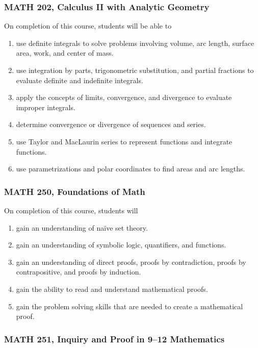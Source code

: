 \documentclass[10pt]{article}
\newenvironment{alphalist}{
\begin{enumerate}[label=(\arabic*),widest=107 ,leftmargin=25pt, itemsep=0pt]}
{\end{enumerate}}
\begin{document}
\subsubsection*{MATH 202, Calculus II with Analytic Geometry}

 On completion of this course, students will be able to
 \begin{alphalist}
    \item use definite integrals to solve problems involving volume, arc length, 
       surface area, work, and center of mass. 
    \item use integration by parts, trigonometric substitution, and partial fractions 
        to evaluate definite and indefinite integrals.
    \item apply the concepts of limits, convergence, and divergence to evaluate 
        improper integrals.
    \item determine convergence or divergence of sequences and series.
    \item use Taylor and MacLaurin series to represent functions and integrate 
        functions.
    \item use parametrizations and polar coordinates to find areas and arc lengths.
 \end{alphalist}

\subsubsection*{MATH 250, Foundations of Math}


On completion of this course, students will
\begin{alphalist}
    \item gain an understanding of na\"ive set theory. 
    \item gain an understanding of symbolic logic, quantifiers, and functions.
    \item gain an understanding of direct proofs, proofs by contradiction, proofs by contrapositive, and proofs by induction.
    \item gain the ability to read and understand mathematical proofs.
    \item gain the problem solving skills that are needed to create a mathematical proof.
\end{alphalist}

\subsubsection*{MATH 251, Inquiry and Proof in 9--12 Mathematics}
\end{document}

